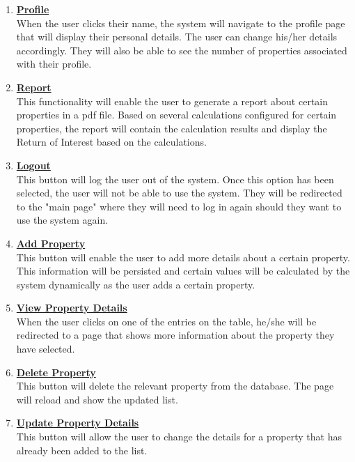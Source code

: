 \documentclass[a4paper,12pt]{article}
\begin{document}
	\begin{enumerate}
		\item{\underline{\bfseries Profile}}\\[0.2cm] 
		When the user clicks their name, the system will navigate to the profile page that will display their personal details. 				The user can change his/her details accordingly. They will also be able to see the number of properties associated 				with their profile.
		\bigskip
		\item{\underline{\bfseries Report}}\\[0.2cm] 
		This functionality will enable the user to generate a report about certain properties in a pdf file. Based on several calculations 				configured for certain properties, the report will contain the calculation results and display the Return of Interest based 			on the calculations. 
		\bigskip
		\item{\underline{\bfseries Logout}}\\[0.2cm] 
		This button will log the user out of the system. Once this option has been selected, the user will not be able to use the 				system. They will be redirected to the "main page" where they will need to log in again should they want to use the system 				again. 
		\bigskip
		\item{\underline{\bfseries Add Property}}\\[0.2cm] 
		This button will enable the user to add more details about a certain property. This information will be persisted and 				certain values will be calculated by the system dynamically as the user adds a certain property.
		\bigskip
		\item{\underline{\bfseries View Property Details}}\\[0.2cm] 
		When the user clicks on one of the entries on the table, he/she will be redirected to a page that shows more information 		about the property they have selected.
		\bigskip
		\item{\underline{\bfseries Delete Property}}\\[0.2cm] 
		This button will delete the relevant property from the database. The page will reload and show the updated list.
		\bigskip
		\item{\underline{\bfseries Update Property Details}}\\[0.2cm] 
		This button will allow the user to change the details for a property that has already been added to the list.
	\end{enumerate}

\end{document}
